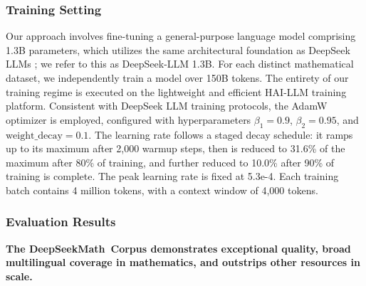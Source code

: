 \subsubsection{Training Setting}
\label{sec:quality-policy}
Our approach involves fine-tuning a general-purpose language model comprising 1.3B parameters, which utilizes the same architectural foundation as DeepSeek LLMs \citep{deepseek-llm}; we refer to this as DeepSeek-LLM 1.3B. For each distinct mathematical dataset, we independently train a model over 150B tokens. The entirety of our training regime is executed on the lightweight and efficient HAI-LLM \citep{haillm} training platform. Consistent with DeepSeek LLM training protocols, the AdamW optimizer \citep{adamW} is employed, configured with hyperparameters $\beta_1=0.9$, $\beta_2=0.95$, and $\mathrm{weight\_decay}=0.1$. The learning rate follows a staged decay schedule: it ramps up to its maximum after 2,000 warmup steps, then is reduced to 31.6\% of the maximum after 80\% of training, and further reduced to 10.0\% after 90\% of training is complete. The peak learning rate is fixed at 5.3e-4. Each training batch contains 4 million tokens, with a context window of 4,000 tokens.

\subsubsection{Evaluation Results}

\textbf{The DeepSeekMath~Corpus demonstrates exceptional quality, broad multilingual coverage in mathematics, and outstrips other resources in scale.}

